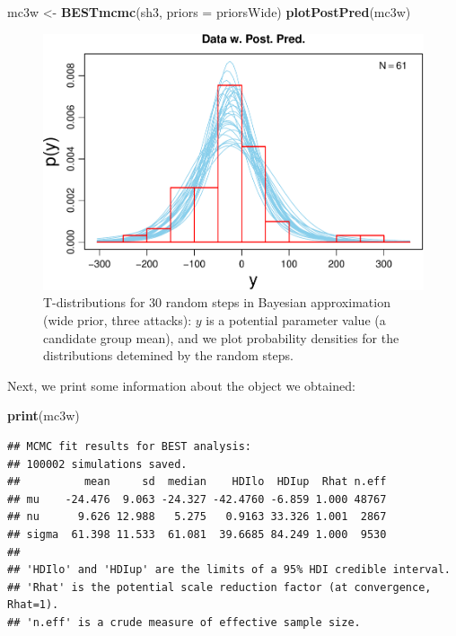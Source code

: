 \documentclass[10pt,]{scrartcl}
\newenvironment{Shaded}{\begin{snugshade}}{\end{snugshade}}
\newcommand{\KeywordTok}[1]{\textcolor[rgb]{0.13,0.29,0.53}{\textbf{#1}}}
\newcommand{\DataTypeTok}[1]{\textcolor[rgb]{0.13,0.29,0.53}{#1}}
\newcommand{\StringTok}[1]{\textcolor[rgb]{0.31,0.60,0.02}{#1}}
\newcommand{\NormalTok}[1]{#1}
\begin{document}
\footnotesize

\begin{Shaded}
\begin{Highlighting}[]
\NormalTok{mc3w <-}\StringTok{ }\KeywordTok{BESTmcmc}\NormalTok{(sh3, }\DataTypeTok{priors =}\NormalTok{ priorsWide)}
\KeywordTok{plotPostPred}\NormalTok{(mc3w)}
\end{Highlighting}
\end{Shaded}

\normalsize

\begin{figure}

\begin{center}\includegraphics[width=1\linewidth]{redditAnalysisWalkthrough_files/figure-latex/unnamed-chunk-50-1} \end{center}
\label{fig:threeWidePostPred}
\caption{T-distributions for 30 random steps in Bayesian approximation (wide prior, three attacks): $y$ is a potential parameter value (a candidate group mean), and we plot probability densities for the distributions detemined by the random steps.}
\end{figure}

Next, we print some information about the object we obtained:

\footnotesize

\begin{Shaded}
\begin{Highlighting}[]
\KeywordTok{print}\NormalTok{(mc3w)}
\end{Highlighting}
\end{Shaded}

\begin{verbatim}
## MCMC fit results for BEST analysis:
## 100002 simulations saved.
##          mean     sd  median    HDIlo  HDIup  Rhat n.eff
## mu    -24.476  9.063 -24.327 -42.4760 -6.859 1.000 48767
## nu      9.626 12.988   5.275   0.9163 33.326 1.001  2867
## sigma  61.398 11.533  61.081  39.6685 84.249 1.000  9530
## 
## 'HDIlo' and 'HDIup' are the limits of a 95% HDI credible interval.
## 'Rhat' is the potential scale reduction factor (at convergence, Rhat=1).
## 'n.eff' is a crude measure of effective sample size.
\end{verbatim}
\end{document}
